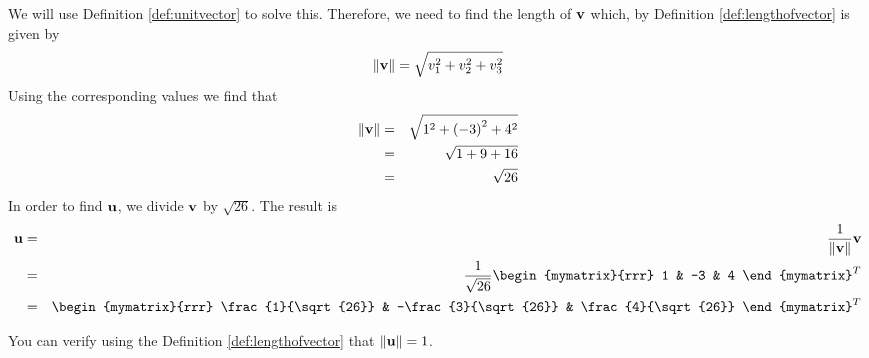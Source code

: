 \begin{solution}
We will use Definition \ref{def:unitvector} to solve this. 
Therefore, we need to find the length of ${\bf v}$ which, by Definition \ref{def:lengthofvector}
is given by 
\begin{equation*}
\|
{\bf v}
\|
= \sqrt{ v_{1}^2 + v_{2}^2+ v_{3}^2}
\end{equation*}
Using the corresponding  values we find that
\begin{eqnarray*}
\|
{\bf v}
\|
&=& \sqrt{ 1^2 + \left(-3 \right)^2 + 4^2} \\
&=& \sqrt{ 1 + 9 + 16} \\
&=& \sqrt{26} 
\end{eqnarray*}
In order to find ${\bf u}$, we divide ${\bf v}$ by $\sqrt{26}$.
The result is 
\begin{eqnarray*}
\vect{u}
&=&
\frac{1}{\norm{\vect{v}}}
\vect{v} \\
&=&
\frac{1}{\sqrt{26}}
\begin{mymatrix}{rrr}
1 & -3 & 4
\end{mymatrix}^T \\
&=&
\begin{mymatrix}{rrr}
\frac{1}{\sqrt{26}} & -\frac{3}{\sqrt{26}} & \frac{4}{\sqrt{26}}
\end{mymatrix}^T
\end{eqnarray*}

You can verify using the Definition \ref{def:lengthofvector} that $\|{\bf u}\| = 1 $. 
\end{solution}
